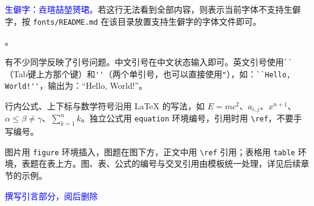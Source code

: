 \textcolor{blue}{生僻字：垚瑄喆堃赟珺。}若这行无法看到全部内容，则表示当前字体不支持生僻字，按 \verb|fonts/README.md| 在该目录放置支持生僻字的字体文件即可。

{}。

有不少同学反映了引号问题。中文引号在中文状态输入即可。英文引号使用\verb|``|（Tab键上方那个键）和\verb|''|（两个单引号，也可以直接使用\verb|"|），如：\verb|``Hello, World!''|，输出为：``Hello, World!''。

行内公式、上下标与数学符号沿用 \LaTeX{} 的写法，如 $E = mc^2$、$a_{i,j}$、$x^{n+1}$、$\alpha \leq \beta \neq \gamma$、$\sum_{k=1}^{n} k$。独立公式用 \verb|equation| 环境编号，引用时用 \verb|\ref|，不要手写编号。

图片用 \verb|figure| 环境插入，图题在图下方，正文中用 \verb|\ref| 引用；表格用 \verb|table| 环境，表题在表上方。图、表、公式的编号与交叉引用由模板统一处理，详见后续章节的示例。

\textcolor{blue}{撰写引言部分，阅后删除}
